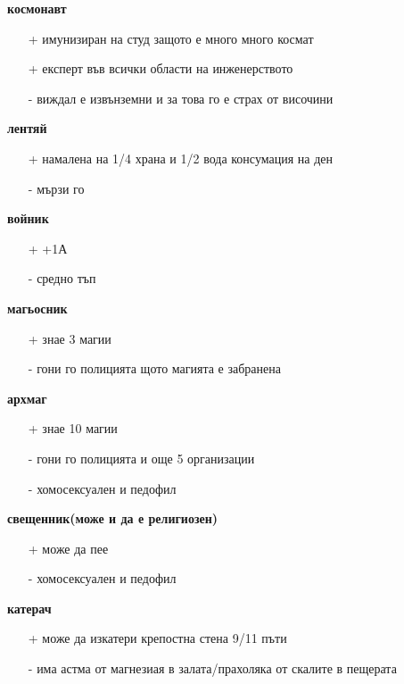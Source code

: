 \documentclass{article}
\begin{document}
\textbf{космонавт}
\begin{itemize}
\item[+] имунизиран на студ защото е много много космат
\item[+] експерт във всички области на инженерството
\item[-] виждал е извънземни и за това го е страх от височини  \\
\end{itemize}

\textbf{лентяй}
\begin{itemize}
\item[+] намалена на 1/4 храна и 1/2 вода консумация на ден
\item[-] мързи го  \\
\end{itemize}

\textbf{войник}
\begin{itemize}
\item[+] +1А
\item[-] средно тъп  \\
\end{itemize}

\textbf{магьосник}
\begin{itemize}
\item[+] знае 3 магии
\item[-] гони го полицията щото магията е забранена  \\
\end{itemize}

\textbf{архмаг}
\begin{itemize}
\item[+] знае 10 магии
\item[-] гони го полицията и още 5 организации
\item[-] хомосексуален и педофил  \\
\end{itemize}

\textbf{свещенник(може и да е религиозен)}
\begin{itemize}
\item[+] може да пее
\item[-] хомосексуален и педофил  \\
\end{itemize}


\textbf{катерач}
\begin{itemize}
\item[+] може да изкатери крепостна стена 9/11 пъти
\item[-] има астма от магнезиая в залата/прахоляка от скалите в пещерата  \\
\end{itemize}
\end{document}
